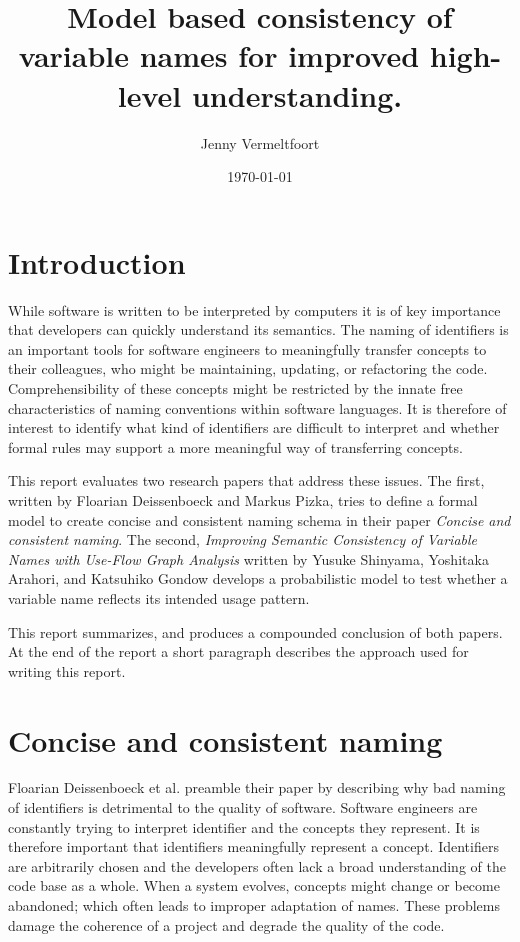 \documentclass[a4paper,12pt]{article}
\begin{document}
\title{Model based consistency of variable names for improved high-level understanding.}
\author{Jenny Vermeltfoort}
\date{\today}
\maketitle

\sectionfont{\centering\MakeUppercase}
\begin{multicols}{2}
\linenumbers

\section*{Introduction}
While software is written to be interpreted by computers it is of key importance that developers can quickly understand its semantics. The naming of identifiers is an important tools for software engineers to meaningfully transfer concepts to their colleagues, who might be maintaining, updating, or refactoring the code. Comprehensibility of these concepts might be restricted by the innate free characteristics of naming conventions within software languages. It is therefore of interest to identify what kind of identifiers are difficult to interpret and whether formal rules may support a more meaningful way of transferring concepts.

This report evaluates two research papers that address these issues. The first, written by Floarian Deissenboeck and Markus Pizka, tries to define a formal model to create concise and consistent naming schema in their paper \textit{Concise and consistent naming}.\cite{deisenbock_concise_2005} The second, \textit{Improving Semantic Consistency of Variable Names with Use-Flow Graph Analysis} written by Yusuke Shinyama, Yoshitaka Arahori, and Katsuhiko Gondow develops a probabilistic model to test whether a variable name reflects its intended usage pattern.\cite{shinyama_improving_2021}

This report summarizes, and produces a compounded conclusion of both papers. At the end of the report a short paragraph describes the approach used for writing this report.

\section*{Concise and consistent naming}
Floarian Deissenboeck et al. preamble their paper by describing why bad naming of identifiers is detrimental to the quality of software. Software engineers are constantly trying to interpret identifier and the concepts they represent.\cite{deisenbock_concise_2005} It is therefore important that identifiers meaningfully represent a concept. Identifiers are arbitrarily chosen and the developers often lack a broad understanding of the code base as a whole. When a system evolves, concepts might change or become abandoned; which often leads to improper adaptation of names. These problems damage the coherence of a project and degrade the quality of the code.


\end{multicols}
\end{document}
